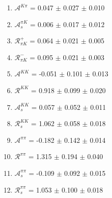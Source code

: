 \begin{enumerate}
\item $\mathcal{A}^{K\pi}$ = 0.047 $\pm$ 0.027 $\pm$ 0.010
\item $\mathcal{A}_s^{\pi K}$ = 0.006 $\pm$ 0.017 $\pm$ 0.012
\item $\mathcal{R}_{\pi K}^+$ = 0.064 $\pm$ 0.021 $\pm$ 0.005
\item $\mathcal{R}_{\pi K}^-$ = 0.095 $\pm$ 0.021 $\pm$ 0.003
\item $\mathcal{A}^{KK}$ = -0.051 $\pm$ 0.101 $\pm$ 0.013
\item $\mathcal{R}^{KK}$ = 0.918 $\pm$ 0.099 $\pm$ 0.020
\item $\mathcal{A}_s^{KK}$ = 0.057 $\pm$ 0.052 $\pm$ 0.011
\item $\mathcal{R}_{s}^{KK}$ = 1.062 $\pm$ 0.058 $\pm$ 0.018
\item $\mathcal{A}^{\pi\pi}$ = -0.182 $\pm$ 0.142 $\pm$ 0.014
\item $\mathcal{R}^{\pi\pi}$ = 1.315 $\pm$ 0.194 $\pm$ 0.040
\item $\mathcal{A}_s^{\pi\pi}$ = -0.109 $\pm$ 0.092 $\pm$ 0.015
\item $\mathcal{R}_{s}^{\pi\pi}$ = 1.053 $\pm$ 0.100 $\pm$ 0.018
\end{enumerate}
